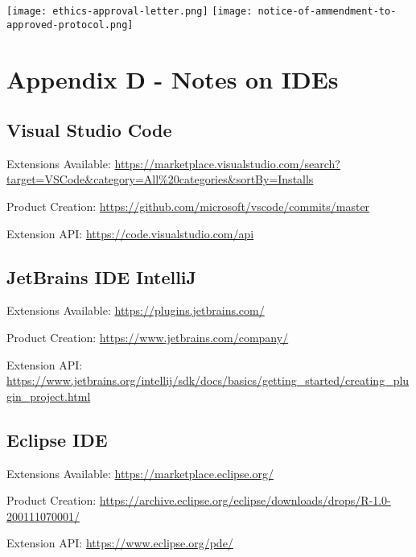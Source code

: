 \texttt{[image: ethics-approval-letter.png]}
\newpage
\texttt{[image: notice-of-ammendment-to-approved-protocol.png]}

\newpage
\section{Appendix D - Notes on IDEs} \label{notesOnIDE}

\subsection{Visual Studio Code}

Extensions Available:  \url{https://marketplace.visualstudio.com/search?target=VSCode\&category=All\%20categories&sortBy=Installs}

Product Creation: \url{https://github.com/microsoft/vscode/commits/master}

Extension API: \url{https://code.visualstudio.com/api}

\subsection{JetBrains IDE IntelliJ}

Extensions Available: \url{https://plugins.jetbrains.com/}

Product Creation: \url{https://www.jetbrains.com/company/} 

Extension API: \url{https://www.jetbrains.org/intellij/sdk/docs/basics/getting_started/creating_plugin_project.html}

\subsection{Eclipse IDE}

Extensions Available: \url{https://marketplace.eclipse.org/}

Product Creation: \url{https://archive.eclipse.org/eclipse/downloads/drops/R-1.0-200111070001/}

Extension API: \url{https://www.eclipse.org/pde/}